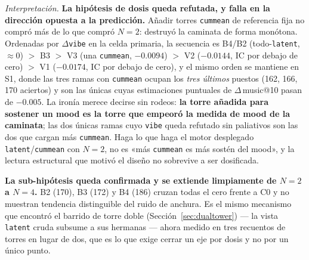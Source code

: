 \documentclass[11pt]{article}
\begin{document}
\emph{Interpretación.} \textbf{La hipótesis de dosis queda refutada, y falla en la
dirección opuesta a la predicción.} Añadir torres \texttt{cummean} de referencia
fija no compró más de lo que compró $N=2$: destruyó la caminata de forma
monótona. Ordenadas por $\Delta$\texttt{vibe} en la celda primaria, la secuencia es
B4/B2 (todo-\texttt{latent}, ${\approx}0$) $>$ B3 $>$ V3 (una \texttt{cummean},
$-\num{0.0094}$) $>$ V2 ($-\num{0.0144}$, IC por debajo de cero) $>$ V1
($-\num{0.0174}$, IC por debajo de cero), y el mismo orden se mantiene en S1,
donde las tres ramas con \texttt{cummean} ocupan los \emph{tres últimos} puestos
(\num{162}, \num{166}, \num{170} aciertos) y son las únicas cuyas estimaciones
puntuales de $\Delta$\,music@10 pasan de $-\num{0.005}$. La ironía merece decirse
sin rodeos: \textbf{la torre añadida para sostener un mood es la torre que empeoró
la medida de mood de la caminata}; las dos únicas ramas cuyo \texttt{vibe} queda
refutado sin paliativos son las dos que cargan más \texttt{cummean}. Haga lo que
haga el motor desplegado \texttt{latent}/\texttt{cummean} con $N=2$, no es «más
\texttt{cummean} es más sostén del mood», y la lectura estructural que motivó el
diseño no sobrevive a ser dosificada.

\textbf{La sub-hipótesis queda confirmada y se extiende limpiamente de $N=2$ a
$N=4$.} B2 (\num{170}), B3 (\num{172}) y B4 (\num{186}) cruzan todas el cero
frente a C0 y no muestran tendencia distinguible del ruido de anchura. Es el mismo
mecanismo que encontró el barrido de torre doble (Sección~\ref{sec:dualtower})
--- la vista \texttt{latent} cruda subsume a sus hermanas --- ahora medido en tres
recuentos de torres en lugar de dos, que es lo que exige cerrar un eje por dosis y
no por un único punto.
\end{document}
